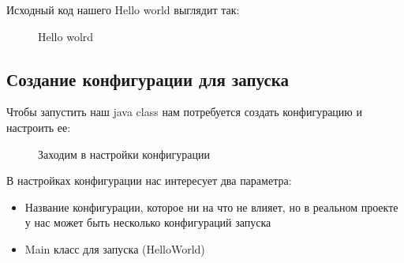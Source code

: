 \documentclass[12pt, a4paper]{article}
\begin{document}
    Исходный код нашего Hello world выглядит так:
    
    \begin{figure}[H]
        \caption{Hello wolrd}
    \end{figure}

    \subsection{Создание конфигурации для запуска}

    Чтобы запустить наш java class нам потребуется создать конфигурацию и настроить ее:

    \begin{figure}[H]
        \caption{Заходим в настройки конфигурации}
    \end{figure}

    В настройках конфигурации нас интересует два параметра:
    \begin{itemize}
        \item Название конфигурации, которое ни на что не влияет, но в реальном проекте у нас может быть
        несколько конфигураций запуска
        \item Main класс для запуска (HelloWorld)
    \end{itemize}
\end{document}
